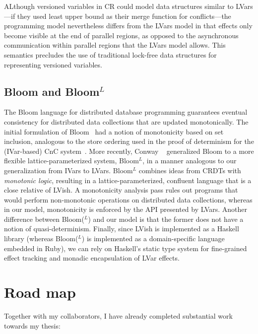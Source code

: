 \documentclass{article}
\begin{document}
ALthough versioned variables in CR could model data structures similar
to LVars---if they used least upper bound as their merge function for
conflicts---the programming model nevertheless differs from the LVars
model in that effects only become visible at the end of parallel
regions, as opposed to the asynchronous communication within parallel
regions that the LVars model allows.  This semantics precludes the use
of traditional lock-free data structures for representing versioned
variables.

\subsection{Bloom and Bloom$^L$}

The Bloom language for distributed database programming guarantees
eventual consistency for distributed data collections that are updated
monotonically.  The initial formulation of Bloom~\cite{bloom-cidr} had
a notion of monotonicity based on set inclusion, analogous to the
store ordering used in the proof of determinism for the (IVar-based)
CnC system~\cite{CnC}.  More recently, Conway \etal~\cite{blooml}
generalized Bloom to a more flexible lattice-parameterized system,
Bloom$^L$, in a manner analogous to our generalization from IVars to
LVars.  Bloom$^L$ combines ideas from CRDTs with \emph{monotonic
  logic}, resulting in a lattice-parameterized, confluent language
that is a close relative of LVish.  A monotonicity analysis pass rules
out programs that would perform non-monotonic operations on
distributed data collections, whereas in our model, monotonicity is
enforced by the API presented by LVars.  Another difference between
Bloom($^L$) and our model is that the former does not have a notion of
quasi-determinism.  Finally, since LVish is implemented as a
Haskell library (whereas Bloom($^L$) is implemented as a
domain-specific language embedded in Ruby), we can rely on Haskell's
static type system for fine-grained effect tracking and monadic
encapsulation of LVar effects.

\section{Road map}

Together with my collaborators, I have already completed substantial
work towards my thesis:
\end{document}
